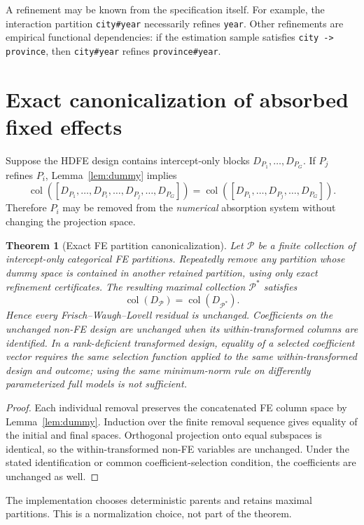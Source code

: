 \documentclass[11pt]{article}
\newtheorem{theorem}{Theorem}[section]
\theoremstyle{definition}
\newcommand{\col}{\operatorname{col}}
\newcommand{\1}{\mathbf{1}}
\begin{document}
A refinement may be known from the specification itself. For example, the interaction partition \texttt{city\#year} necessarily refines \texttt{year}. Other refinements are empirical functional dependencies: if the estimation sample satisfies \texttt{city -> province}, then \texttt{city\#year} refines \texttt{province\#year}.

\section{Exact canonicalization of absorbed fixed effects}

Suppose the HDFE design contains intercept-only blocks $D_{P_1},\dots,D_{P_G}$. If $P_j$ refines $P_i$, Lemma~\ref{lem:dummy} implies
\[
 \col([D_{P_1},\dots,D_{P_i},\dots,D_{P_j},\dots,D_{P_G}])
 =\col([D_{P_1},\dots,D_{P_j},\dots,D_{P_G}]).
\]
Therefore $P_i$ may be removed from the \emph{numerical} absorption system without changing the projection space.

\begin{theorem}[Exact FE partition canonicalization]\label{thm:canon}
Let $\mathcal P$ be a finite collection of intercept-only categorical FE partitions. Repeatedly remove any partition whose dummy space is contained in another retained partition, using only exact refinement certificates. The resulting maximal collection $\mathcal P^*$ satisfies
\[
  \col(D_{\mathcal P})=\col(D_{\mathcal P^*}).
\]
Hence every Frisch--Waugh--Lovell residual is unchanged. Coefficients on the unchanged non-FE design are unchanged when its within-transformed columns are identified. In a rank-deficient transformed design, equality of a selected coefficient vector requires the same selection function applied to the same within-transformed design and outcome; using the same minimum-norm rule on differently parameterized full models is not sufficient.
\end{theorem}
\begin{proof}
Each individual removal preserves the concatenated FE column space by Lemma~\ref{lem:dummy}. Induction over the finite removal sequence gives equality of the initial and final spaces. Orthogonal projection onto equal subspaces is identical, so the within-transformed non-FE variables are unchanged. Under the stated identification or common coefficient-selection condition, the coefficients are unchanged as well.
\end{proof}

The implementation chooses deterministic parents and retains maximal partitions. This is a normalization choice, not part of the theorem.
\end{document}
